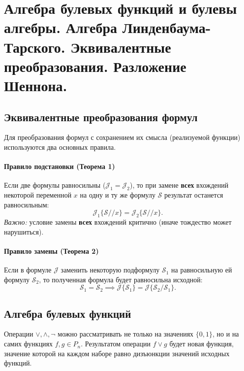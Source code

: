 \section{Алгебра булевых функций и булевы алгебры. Алгебра Линденбаума-Тарского. Эквивалентные преобразования. Разложение Шеннона.}

\subsection*{Эквивалентные преобразования формул}

Для преобразования формул с сохранением их смысла (реализуемой функции) используются два основных правила.

\paragraph{Правило подстановки (Теорема 1)}
Если две формулы равносильны ($\mathcal{J}_1 = \mathcal{J}_2$), то при замене \textbf{всех} вхождений некоторой переменной $x$ на одну и ту же формулу $\mathcal{S}$ результат останется равносильным:
$$\mathcal{J}_1\{ \mathcal{S} // x \} = \mathcal{J}_2\{ \mathcal{S} // x \}.$$
\textit{Важно:} условие замены \textbf{всех} вхождений критично (иначе тождество может нарушиться).

\paragraph{Правило замены (Теорема 2)}
Если в формуле $\mathcal{J}$ заменить некоторую подформулу $\mathcal{S}_1$ на равносильную ей формулу $\mathcal{S}_2$, то полученная формула будет равносильна исходной:
$$\mathcal{S}_1 = \mathcal{S}_2 \implies \mathcal{J}\{ \mathcal{S}_1 \} = \mathcal{J}\{ \mathcal{S}_2 / \mathcal{S}_1 \}.$$

\subsection*{Алгебра булевых функций}

Операции $\lor, \land, \neg$ можно рассматривать не только на значениях $\{0, 1\}$, но и на самих функциях $f, g \in P_n$. Результатом операции $f \lor g$ будет новая функция, значение которой на каждом наборе равно дизъюнкции значений исходных функций.

